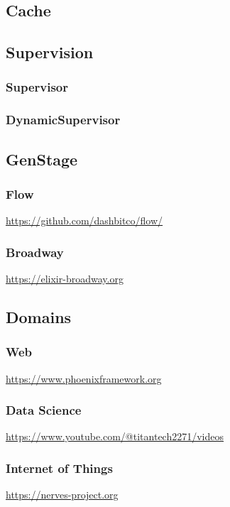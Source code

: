 {\subsection{Cache}

\subsection{Supervision}
\subsubsection{Supervisor}
\subsubsection{DynamicSupervisor}

\subsection{GenStage}
\subsubsection{Flow}

\url{https://github.com/dashbitco/flow/}

\subsubsection{Broadway}

\url{https://elixir-broadway.org}

\subsection{Domains}

\subsubsection{Web}

\url{https://www.phoenixframework.org}



\subsubsection{Data Science}

\url{https://www.youtube.com/@titantech2271/videos}

\subsubsection{Internet of Things}

\url{https://nerves-project.org}

}
